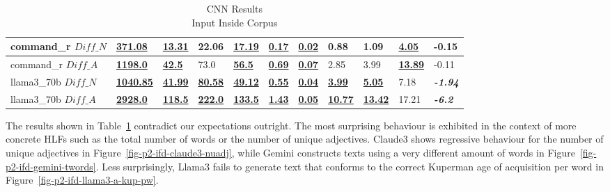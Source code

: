 \documentclass[runningheads,a4paper,11pt]{article}
\begin{document}
\begin{table}[!ht]
{\begin{tabular}{lllllllllll}
            command\_r $Diff\_N$  & \textbf{\underline{371.08}}  & \textbf{\underline{13.31}}  & 22.06                       & \textbf{\underline{17.19}} & \textbf{\underline{0.17}} & \textbf{\underline{0.02}} & 0.88                       & 1.09                       & \textbf{\underline{4.05}}  & -0.15                   \\ \midrule
            command\_r $Diff\_A$  & \textbf{\underline{1198.0}}  & \textbf{\underline{42.5}}   & 73.0                        & \textbf{\underline{56.5}}  & \textbf{\underline{0.69}} & \textbf{\underline{0.07}} & 2.85                       & 3.99                       & \textbf{\underline{13.89}} & -0.11                   \\ \midrule
            llama3\_70b $Diff\_N$ & \textbf{\underline{1040.85}} & \textbf{\underline{41.99}}  & \textbf{\underline{80.58}}  & \textbf{\underline{49.12}} & \textbf{\underline{0.55}} & \textbf{\underline{0.04}} & \textbf{\underline{3.99}}  & \textbf{\underline{5.05}}  & 7.18                       & \textbf{\textit{-1.94}} \\ \midrule
            llama3\_70b $Diff\_A$ & \textbf{\underline{2928.0}}  & \textbf{\underline{118.5}}  & \textbf{\underline{222.0}}  & \textbf{\underline{133.5}} & \textbf{\underline{1.43}} & \textbf{\underline{0.05}} & \textbf{\underline{10.77}} & \textbf{\underline{13.42}} & 17.21                      & \textbf{\textit{-6.2}}  \\ \bottomrule
        \end{tabular}%
    }
    \caption{CNN Results\\Input Inside Corpus}
    \label{table-prompt-2-ifd-cnn-dailymail}
\end{table}

The results shown in Table~\ref{table-prompt-2-ifd-cnn-dailymail} contradict our
expectations outright.
The most surprising behaviour is exhibited in the context of more concrete HLFs
such as the total number of words or the number of unique adjectives.
Claude3 shows regressive behaviour for the number of unique adjectives in
Figure~\ref{fig-p2-ifd-claude3-nuadj}, while Gemini constructs texts using a
very different amount of words in Figure~\ref{fig-p2-ifd-gemini-twords}.
Less surprisingly, Llama3 fails to generate text that conforms to the correct
Kuperman age of acquisition per word in Figure~\ref{fig-p2-ifd-llama3-a-kup-pw}.
\end{document}
